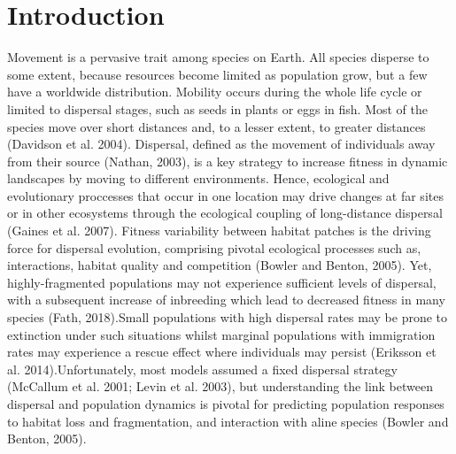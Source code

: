 \documentclass[12pt]{article}
\begin{document}
\section{Introduction}
Movement is a pervasive trait among species on Earth. All species
disperse to some extent, because resources become limited as
population grow, but a few have a worldwide distribution. Mobility
occurs during the whole life cycle or limited to dispersal stages,
such as seeds in plants or eggs in fish. Most of the species move over
short distances and, to a lesser extent, to greater distances
(Davidson et al. 2004). Dispersal, defined as the movement of
individuals away from their source (Nathan, 2003), is a key strategy
to increase fitness in dynamic landscapes by moving to different
environments. Hence, ecological and evolutionary proccesses that occur
in one location may drive changes at far sites or in other ecosystems
through the ecological coupling of long-distance dispersal (Gaines et
al. 2007). Fitness variability between habitat patches is the driving
force for dispersal evolution, comprising pivotal ecological processes
such as, interactions, habitat quality and competition (Bowler and
Benton, 2005). Yet, highly-fragmented populations may not experience
sufficient levels of dispersal, with a subsequent increase of
inbreeding which lead to decreased fitness in many species (Fath,
2018).Small populations with high dispersal rates may be prone to
extinction under such situations whilst marginal populations with
immigration rates may experience a rescue effect where individuals may
persist (Eriksson et al. 2014).Unfortunately, most models assumed a
fixed dispersal strategy (McCallum et al. 2001; Levin et al. 2003),
but understanding the link between dispersal and population dynamics
is pivotal for predicting population responses to habitat loss and
fragmentation, and interaction with aline species (Bowler and Benton,
2005).
\end{document}
